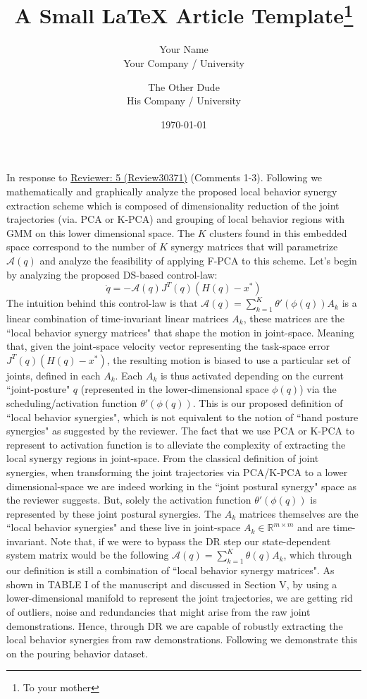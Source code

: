 \documentclass{article}
\title{A Small \LaTeX{} Article Template\thanks{To your mother}}
\author{Your Name  \\
	Your Company / University  \\
	\and 
	The Other Dude \\
	His Company / University \\
	}
\date{\today}
\begin{document}
\vspace{-10pt}
In response to \underline{Reviewer: 5 (Review30371)} (Comments 1-3). Following we mathematically and graphically analyze the proposed local behavior synergy extraction scheme which is composed of dimensionality reduction of the joint trajectories (via. PCA or K-PCA) and grouping of local behavior regions with GMM on this lower dimensional space. The $K$ clusters found in this embedded space correspond to the number of $K$ synergy matrices that will parametrize $\mathcal{A}(q)$ and analyze the feasibility of applying F-PCA to this scheme. Let's begin by analyzing the proposed DS-based control-law:
\begin{equation}
\dot{q} = -\mathcal{A}(q)J^{T}(q)(H(q)-x^*)
\end{equation}
The intuition behind this control-law is that $\mathcal{A}(q) = \sum\limits_{k=1}^{K}\theta'(\phi(q))A_k$ is a linear combination of time-invariant linear matrices $A_k$, these matrices are the ``local behavior synergy matrices" that shape the motion in joint-space. Meaning that, given the joint-space velocity vector representing the task-space error $J^{T}(q)(H(q)-x^*)$, the resulting motion is biased to use a particular set of joints, defined in each $A_k$. Each $A_k$ is thus activated depending on the current ``joint-posture" $q$ (represented in the lower-dimensional space $\phi(q)$) via the scheduling/activation function $\theta'(\phi(q))$. This is our proposed definition of ``local behavior synergies", which is not equivalent to the notion of ``hand posture synergies" as suggested by the reviewer. The fact that we use PCA or K-PCA to represent to activation function is to alleviate the complexity of extracting the local synergy regions in joint-space. From the classical definition of joint synergies, when transforming the joint trajectories via PCA/K-PCA to a lower dimensional-space we are indeed working in the ``joint postural synergy" space as the reviewer suggests. But, solely the activation function $\theta'(\phi(q))$ is represented by these joint postural synergies. The $A_k$ matrices themselves are the ``local behavior synergies" and these live in joint-space $A_k\in \mathbb{R}^{m \times m}$ and are time-invariant. Note that, if we were to bypass the DR step our state-dependent system matrix would be the following $\mathcal{A}(q)= \sum\limits_{k=1}^{K}\theta(q)A_k$, which through our definition is still a combination of ``local behavior synergy matrices". As shown in TABLE I of the manuscript and discussed in Section V, by using a lower-dimensional manifold to represent the joint trajectories, we are getting rid of outliers, noise and redundancies that might arise from the raw joint demonstrations. Hence, through DR we are capable of robustly extracting the local behavior synergies from raw demonstrations. Following we demonstrate this on the pouring behavior dataset.
\end{document}
